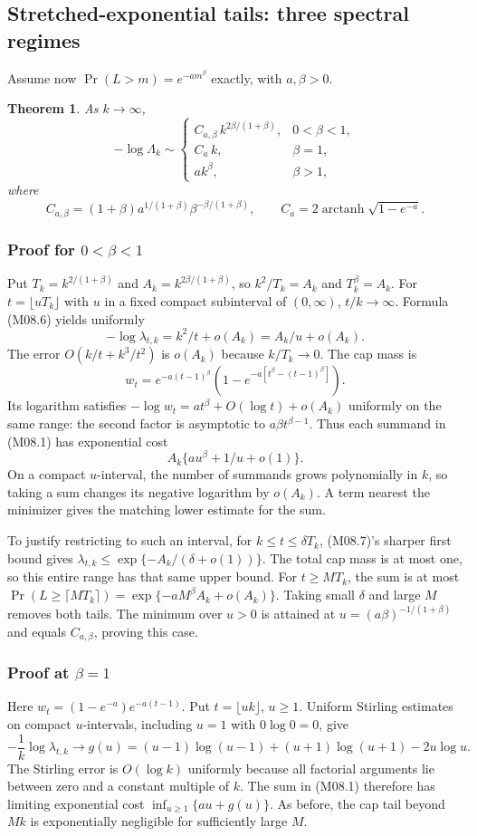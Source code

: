 \documentclass[11pt,a4paper]{article}
\newtheorem{theorem}{Theorem}[section]
\theoremstyle{definition}\newtheorem{definition}[theorem]{Definition}
\theoremstyle{remark}\newtheorem{remark}[theorem]{Remark}
\numberwithin{equation}{section}
\begin{document}
\subsection{Stretched-exponential tails: three spectral regimes}\label{M08-sec-4}
Assume now $\Pr(L>m)=e^{-a m^\beta}$ exactly, with $a,\beta>0$.
\begin{theorem}\label{M08-th:stretch}
As $k\to\infty$,
\[
 -\log\Lambda_k\sim
 \begin{cases}
 C_{a,\beta}\,k^{2\beta/(1+\beta)},&0<\beta<1,\\
 C_a\,k,&\beta=1,\\
 a k^\beta,&\beta>1,
 \end{cases}\tag{M08.8}
\]
where
\[
 C_{a,\beta}=(1+\beta)a^{1/(1+\beta)}\beta^{-\beta/(1+\beta)},
 \qquad C_a=2\operatorname{arctanh}\sqrt{1-e^{-a}}.
\]
\end{theorem}

\subsubsection{Proof for $0<\beta<1$}
Put $T_k=k^{2/(1+\beta)}$ and $A_k=k^{2\beta/(1+\beta)}$, so $k^2/T_k=A_k$ and $T_k^\beta=A_k$. For $t=\lfloor uT_k\rfloor$ with $u$ in a fixed compact subinterval of $(0,\infty)$, $t/k\to\infty$. Formula (M08.6) yields uniformly
\[
 -\log\lambda_{t,k}=k^2/t+o(A_k)=A_k/u+o(A_k).
\]
The error $O(k/t+k^3/t^2)$ is $o(A_k)$ because $k/T_k\to0$. The cap mass is
\[
 w_t=e^{-a(t-1)^\beta}\left(1-e^{-a[t^\beta-(t-1)^\beta]}\right).
\]
Its logarithm satisfies $-\log w_t=a t^\beta+O(\log t)+o(A_k)$ uniformly on the same range: the second factor is asymptotic to $a\beta t^{\beta-1}$. Thus each summand in (M08.1) has exponential cost
\[
 A_k\{a u^\beta+1/u+o(1)\}.
\]
On a compact $u$-interval, the number of summands grows polynomially in $k$, so taking a sum changes its negative logarithm by $o(A_k)$. A term nearest the minimizer gives the matching lower estimate for the sum.

To justify restricting to such an interval, for $k\le t\le\delta T_k$, (M08.7)'s sharper first bound gives
$\lambda_{t,k}\le\exp\{-A_k/(\delta+o(1))\}$.
The total cap mass is at most one, so this entire range has that same upper bound. For $t\ge M T_k$, the sum is at most
$\Pr(L\ge\lceil M T_k\rceil)=\exp\{-a M^\beta A_k+o(A_k)\}$.
Taking small $\delta$ and large $M$ removes both tails. The minimum over $u>0$ is attained at $u=(a\beta)^{-1/(1+\beta)}$ and equals $C_{a,\beta}$, proving this case.

\subsubsection{Proof at $\beta=1$}
Here $w_t=(1-e^{-a})e^{-a(t-1)}$. Put $t=\lfloor uk\rfloor$, $u\ge1$. Uniform Stirling estimates on compact $u$-intervals, including $u=1$ with $0\log0=0$, give
\[
 -\frac1k\log\lambda_{t,k}\longrightarrow
 g(u)=(u-1)\log(u-1)+(u+1)\log(u+1)-2u\log u.
\]
The Stirling error is $O(\log k)$ uniformly because all factorial arguments lie between zero and a constant multiple of $k$. The sum in (M08.1) therefore has limiting exponential cost $\inf_{u\ge1}\{a u+g(u)\}$. As before, the cap tail beyond $Mk$ is exponentially negligible for sufficiently large $M$.
\end{document}
